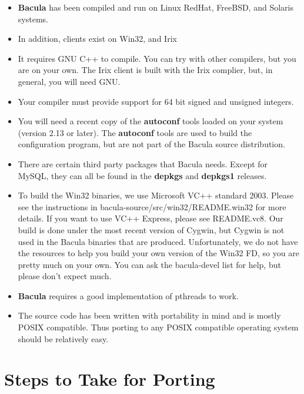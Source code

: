 \begin{itemize}
\item {\bf Bacula} has been compiled and run on Linux RedHat, FreeBSD,  and
   Solaris systems. 
\item In addition, clients exist on Win32, and Irix 
\item It requires GNU C++ to compile. You can try with other compilers, but 
   you are on your own. The Irix client is built with the Irix complier,  but, in
   general, you will need GNU. 
\item Your compiler must provide support for 64 bit signed and unsigned 
   integers. 
\item You will need a recent copy of the {\bf autoconf} tools loaded  on your
   system (version 2.13 or later). The {\bf autoconf} tools  are used to build
   the configuration program, but are not part of  the Bacula source
distribution. 
\item There are certain third party packages that Bacula needs. Except  for
   MySQL, they can all be found in the {\bf depkgs} and  {\bf depkgs1} releases. 
\item To build the Win32 binaries, we use Microsoft VC++ standard
   2003. Please see the instructions in
   bacula-source/src/win32/README.win32 for more details. If you
   want to use VC++ Express, please see README.vc8. Our build is
   done under the most recent version of Cygwin, but Cygwin is
   not used in the Bacula binaries that are produced.
   Unfortunately, we do not have the resources to help you build
   your own version of the Win32 FD, so you are pretty much on
   your own. You can ask the bacula-devel list for help, but
   please don't expect much.
\item {\bf Bacula} requires a good implementation of pthreads to work. 
\item The source code has been written with portability in mind and is  mostly
   POSIX compatible. Thus porting to any POSIX compatible operating  system
   should be relatively easy. 
\end{itemize}

\section{Steps to Take for Porting}


